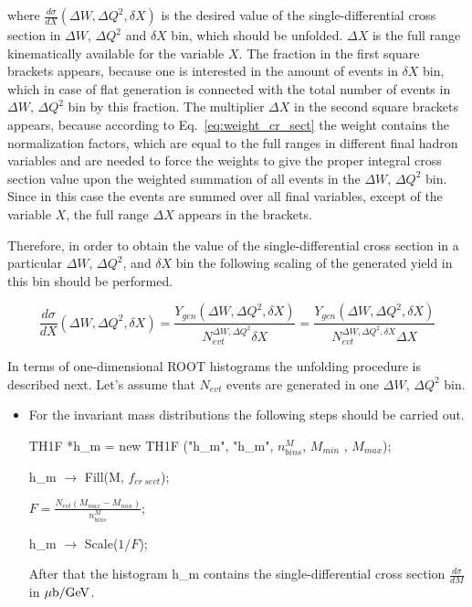 \begin{enumerate}
where $\frac{d\sigma}{dX}(\Delta W,\Delta Q^2,\delta X)$  is the desired value of the single-differential cross section in $\Delta W$, $\Delta Q^2$ and $\delta X$ bin, which should be unfolded. $\Delta X$ is the full range kinematically available for the variable $X$. The fraction in the first square brackets appears, because one is interested in the amount of events in $\delta X$ bin, which in case of flat generation is connected with the total number of events in $\Delta W$, $\Delta Q^2$ bin by this fraction. The multiplier $\Delta X$ in the second square brackets appears, because according to Eq.~\eqref{eq:weight_cr_sect} the weight contains the normalization factors, which are equal to the full ranges in different final hadron variables and are needed to force the weights to give the proper integral cross section value upon the weighted summation of all events in the $\Delta W$, $\Delta Q^2$ bin. Since in this case the events are summed over all final variables, except of the variable $X$, the full range $\Delta X$ appears in the brackets. 

Therefore, in order to obtain the value of the single-differential cross section in a particular $\Delta W$, $\Delta Q^2$, and $\delta X$ bin the following scaling of the generated yield in this bin should be performed.


\begin{equation}
\frac{d\sigma}{dX} (\Delta W,\Delta Q^2,\delta X) = \frac{Y_{gen}(\Delta W,\Delta Q^2,\delta X)}{N_{evt}^{\Delta W,\Delta Q^2}\delta X} =  \frac{Y_{gen}(\Delta W,\Delta Q^2,\delta X)}{N_{evt}^{\Delta W,\Delta Q^2,\delta X}\Delta X}
\end{equation}

In terms of one-dimensional ROOT histograms the unfolding procedure is described next. Let's assume that $N_{evt}$ events are generated in one $\Delta W$, $\Delta Q^2$ bin.

\begin{itemize}
\item For the invariant mass distributions the following steps should be carried out.

TH1F *h\_m = new TH1F ("h\_m", "h\_m", $n_{bins}^{M}$, $M_{min}$ , $M_{max}$);

h\_m $\rightarrow$ Fill(M, $f_{cr~sect}$);

$F = \frac{N_{evt}(M_{max}-M_{min})}{n_{bins}^{M}}$;

h\_m $\rightarrow$ Scale($1/F$);

After that the histogram h\_m contains the single-differential cross section $\frac{d\sigma}{dM}$ in $\mu{\rm b/GeV}$.


\end{itemize}
\end{enumerate}
